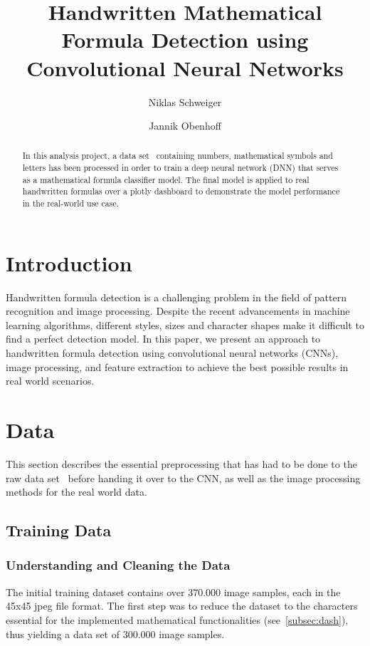 \documentclass[@CLASSOPTIONS@]{tumarticle}
\title{Handwritten Mathematical Formula Detection using Convolutional Neural Networks}
\author[affil={1}, email={niklas.schweiger@tum.de}]{Niklas Schweiger}
\author[affil={1}, email={jannik.obenhoff@tum.de}]{Jannik Obenhoff}
\affil{Department of Electrical and Computer Engineering, Technical
  University of Munich, Arcisstr. 21, 80333 Munich, Germany}
\begin{document}
\twocolumn

\maketitle
\begin{abstract}
  In this analysis project, a data set~\cite{kaggledataset} containing numbers, mathematical
  symbols and letters has been processed in order to train a deep neural network (DNN) that
  serves as a mathematical formula classifier model.
  The final model is applied to real handwritten formulas over a plotly dashboard to demonstrate the model
  performance in the real-world use case.

\end{abstract}

\section{Introduction}

Handwritten formula detection is a challenging problem in the field of pattern recognition and
image processing.
Despite the recent advancements in machine learning algorithms, different styles, sizes and character
shapes make it difficult to find a perfect detection model.
In this paper, we present an approach to handwritten formula detection using convolutional
neural networks (CNNs), image processing, and feature extraction to achieve the best possible results
in real world scenarios.

\section{Data}
\label{sec:measures}

This section describes the essential preprocessing that has had to be done to the raw
data set~\cite{kaggledataset} before handing it over to the CNN,
as well as the image processing methods for the real world data.

\subsection{Training Data}
\subsubsection{Understanding and Cleaning the Data}

The initial training dataset contains over 370.000 image samples, each in the 45x45 jpeg file format.
The first step was to reduce the dataset to the characters essential for the
implemented mathematical functionalities (see~\ref{subsec:dash}),
thus yielding a data set of 300.000 image samples.
\end{document}
